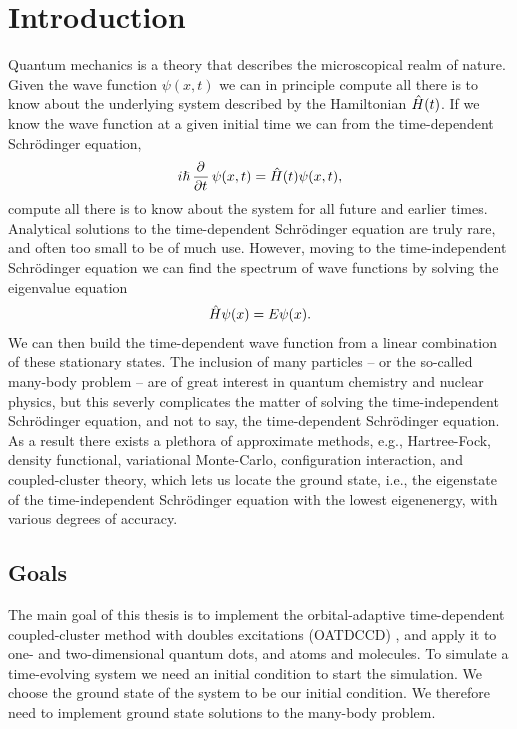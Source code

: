 \chapter{Introduction}
    Quantum mechanics is a theory that describes the microscopical realm of
    nature.
    Given the wave function $\psi(x, t)$ we can in principle compute all there
    is to know about the underlying system described by the Hamiltonian
    $\hat{H}(t)$.
    If we know the wave function at a given initial time we can from the
    time-dependent Schrödinger equation,
    \begin{align}
        i\hslash\dpd{}{t}\psi(x, t) = \hamil(t)\psi(x, t),
    \end{align}
    compute all there is to know about the system for all future and earlier
    times.
    Analytical solutions to the time-dependent Schrödinger equation are truly
    rare, and often too small to be of much use.
    However, moving to the time-independent Schrödinger equation we can find the
    spectrum of wave functions by solving the eigenvalue equation
    \begin{align}
        \hat{H}\psi(x) = E\psi(x).
    \end{align}
    We can then build the time-dependent wave function from a linear combination
    of these stationary states.
    The inclusion of many particles -- or the so-called many-body problem -- are
    of great interest in quantum chemistry and nuclear physics, but this severly
    complicates the matter of solving the time-independent Schrödinger equation,
    and not to say, the time-dependent Schrödinger equation.
    As a result there exists a plethora of approximate methods, e.g.,
    Hartree-Fock, density functional, variational Monte-Carlo, configuration
    interaction, and coupled-cluster theory, which lets us locate the ground
    state, i.e., the eigenstate of the time-independent Schrödinger equation
    with the lowest eigenenergy, with various degrees of accuracy.




    \section{Goals}
        The main goal of this thesis is to implement the orbital-adaptive
        time-dependent coupled-cluster method with doubles excitations (OATDCCD)
        \cite{kvaal2012ab}, and apply it to one- and two-dimensional quantum
        dots, and atoms and molecules.
        To simulate a time-evolving system we need an initial condition to start
        the simulation.
        We choose the ground state of the system to be our initial condition.
        We therefore need to implement ground state solutions to the many-body
        problem.

